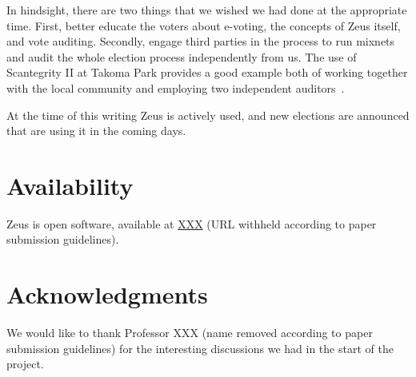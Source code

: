 \documentclass[letterpaper,10pt]{article}
\begin{document}
In hindsight, there are two things that we wished we had done at the
appropriate time. First, better educate the voters about e-voting, the
concepts of Zeus itself, and vote auditing. Secondly, engage third
parties in the process to run mixnets and audit the whole election
process independently from us. The use of Scantegrity II at Takoma
Park provides a good example both of working together with the local
community and employing two independent auditors~\cite{carback:2010}.

At the time of this writing Zeus is actively used, and new elections
are announced that are using it in the coming days.

\section{Availability}

Zeus is open software, available at \url{XXX} (URL withheld according
to paper submission guidelines).

\section{Acknowledgments}

We would like to thank Professor XXX (name removed according to paper
submission guidelines) for the interesting discussions we had in the
start of the project.

{\footnotesize


}
\end{document}
